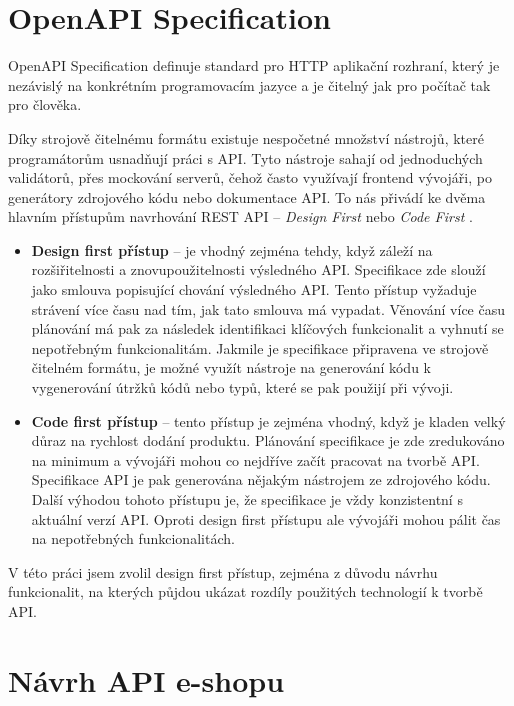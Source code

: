\documentclass[thesis=M,czech]{FITthesis}[2019/12/23]
\begin{document}
\section{OpenAPI Specification}
OpenAPI Specification definuje standard pro HTTP aplikační rozhraní, který je nezávislý na konkrétním programovacím jazyce a je čitelný jak pro počítač tak pro člověka.

Díky strojově čitelnému formátu existuje nespočetné množství nástrojů, které programátorům usnadňují práci s API. Tyto nástroje sahají od jednoduchých validátorů, přes mockování serverů, čehož často využívají frontend vývojáři, po generátory zdrojového kódu nebo dokumentace API. To nás přivádí ke dvěma hlavním přístupům navrhování REST API -- \textit{Design First} nebo \textit{Code First} \cite{api_design_approach}.

\begin{itemize}
  \item \textbf{Design first přístup} -- je vhodný zejména tehdy, když záleží na rozšiřitelnosti a znovupoužitelnosti výsledného API. Specifikace zde slouží jako smlouva popisující chování výsledného API. Tento přístup vyžaduje strávení více času nad tím, jak tato smlouva má vypadat. Věnování více času plánování má pak za následek identifikaci klíčových funkcionalit a vyhnutí se nepotřebným funkcionalitám. Jakmile je specifikace připravena ve strojově čitelném formátu, je možné využít nástroje na generování kódu k vygenerování útržků kódů nebo typů, které se pak použijí při vývoji.
  \item \textbf{Code first přístup} -- tento přístup je zejména vhodný, když je kladen velký důraz na rychlost dodání produktu. Plánování specifikace je zde zredukováno na minimum a vývojáři mohou co nejdříve začít pracovat na tvorbě API. Specifikace API je pak generována nějakým nástrojem ze zdrojového kódu. Další výhodou tohoto přístupu je, že specifikace je vždy konzistentní s aktuální verzí API. Oproti design first přístupu ale vývojáři mohou pálit čas na nepotřebných funkcionalitách.
\end{itemize}

V této práci jsem zvolil design first přístup, zejména z důvodu návrhu funkcionalit, na kterých půjdou ukázat rozdíly použitých technologií k tvorbě API.

\section{Návrh API e-shopu}
\end{document}
